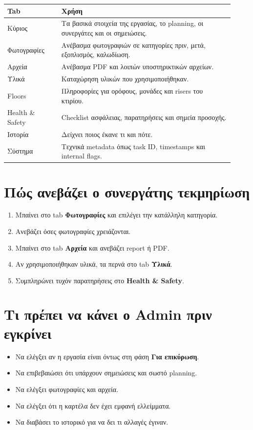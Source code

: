 \documentclass[11pt,a4paper]{article}
\begin{document}
\begin{longtable}{|>{\raggedright\arraybackslash}p{0.22\linewidth}|>{\raggedright\arraybackslash}p{0.7\linewidth}|}
\hline
\textbf{Tab} & \textbf{Χρήση} \\
\hline
Κύριος & Τα βασικά στοιχεία της εργασίας, το planning, οι συνεργάτες και οι σημειώσεις. \\
\hline
Φωτογραφίες & Ανέβασμα φωτογραφιών σε κατηγορίες πριν, μετά, εξοπλισμός, καλωδίωση. \\
\hline
Αρχεία & Ανέβασμα PDF και λοιπών υποστηρικτικών αρχείων. \\
\hline
Υλικά & Καταχώρηση υλικών που χρησιμοποιήθηκαν. \\
\hline
Floors & Πληροφορίες για ορόφους, μονάδες και risers του κτιρίου. \\
\hline
Health \& Safety & Checklist ασφάλειας, παρατηρήσεις και σημεία προσοχής. \\
\hline
Ιστορία & Δείχνει ποιος έκανε τι και πότε. \\
\hline
Σύστημα & Τεχνικά metadata όπως task ID, timestamps και internal flags. \\
\hline
\end{longtable}

\section{Πώς ανεβάζει ο συνεργάτης τεκμηρίωση}

\begin{enumerate}
  \item Μπαίνει στο tab \textbf{Φωτογραφίες} και επιλέγει την κατάλληλη κατηγορία.
  \item Ανεβάζει όσες φωτογραφίες χρειάζονται.
  \item Μπαίνει στο tab \textbf{Αρχεία} και ανεβάζει report ή PDF.
  \item Αν χρησιμοποιήθηκαν υλικά, τα περνά στο tab \textbf{Υλικά}.
  \item Συμπληρώνει τυχόν παρατηρήσεις στο \textbf{Health \& Safety}.
\end{enumerate}

\section{Τι πρέπει να κάνει ο Admin πριν εγκρίνει}

\begin{itemize}
  \item Να ελέγξει αν η εργασία είναι όντως στη φάση \textbf{Για επικύρωση}.
  \item Να επιβεβαιώσει ότι υπάρχουν σημειώσεις και σωστό planning.
  \item Να ελέγξει φωτογραφίες και αρχεία.
  \item Να ελέγξει ότι η καρτέλα δεν έχει εμφανή ελλείμματα.
  \item Να διαβάσει το ιστορικό για να δει τι αλλαγές έγιναν.
\end{itemize}
\end{document}
